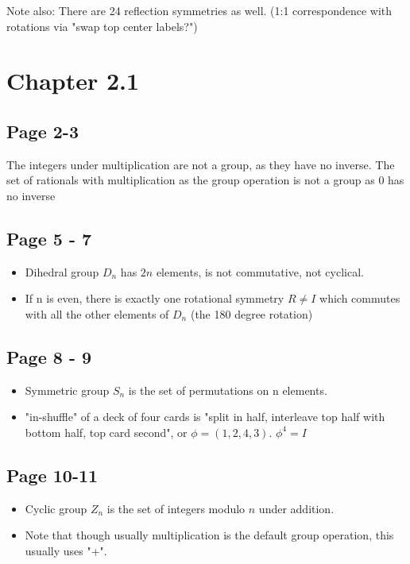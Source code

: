 \documentclass[11pt, oneside]{article}   	%
\begin{document}
Note also: There are 24 reflection symmetries as well. (1:1 correspondence with rotations via "swap top center labels?")

\section {Chapter 2.1}

\subsection {Page 2-3}
The integers under multiplication are not a group, as they have no inverse.
The set of rationals with multiplication as the group operation is not a group as 0 has no inverse

\subsection {Page 5 - 7}

\begin{itemize}
\item Dihedral group $D_n$ has $2n$ elements, is not commutative, not cyclical.
\item If n is even, there is exactly one rotational symmetry $R\neq I$ which commutes with all the other elements of $D_n$ (the 180 degree rotation)
\end{itemize}

\subsection {Page 8 - 9}

\begin{itemize}
\item Symmetric group $S_n$ is the set of permutations on n elements.
\item "in-shuffle" of a deck of four cards is "split in half, interleave top half with bottom half, top card second", or $\phi = (1, 2, 4, 3)$.  $\phi^4 = I$
\end{itemize}

\subsection {Page 10-11}

\begin{itemize}
\item Cyclic group $Z_n$ is the set of integers modulo $n$ under addition.  
\item Note that though usually multiplication is the default group operation, this usually uses "+".
\end{itemize}
\end{document}
